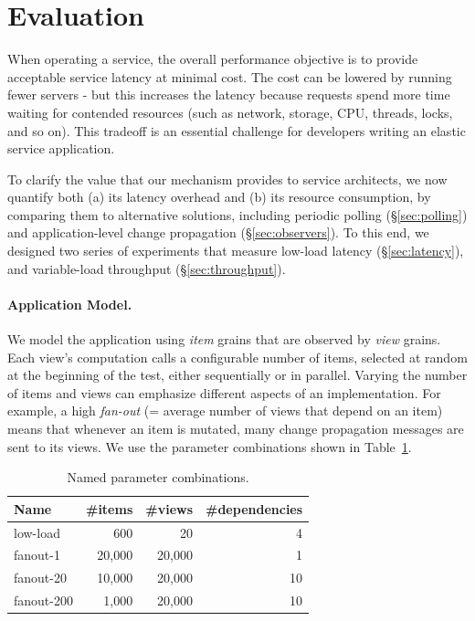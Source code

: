 \section{Evaluation}

When operating a service, the overall performance objective is to provide acceptable service latency at minimal cost. The cost can be lowered by running fewer servers - but this increases the latency because requests spend more time waiting for contended resources (such as network, storage, CPU, threads, locks, and so on). This tradeoff is an essential challenge for developers writing an elastic service application. 

To clarify the value that our mechanism provides to service architects, we now quantify both (a) its latency overhead and (b) its resource consumption, by comparing them to alternative solutions, including periodic polling (\S\ref{sec:polling}) and application-level change propagation (\S\ref{sec:observers}). To this end, we designed two series of experiments that measure low-load latency (\S\ref{sec:latency}), and variable-load throughput (\S\ref{sec:throughput}).

\paragraph{Application Model.}  
We model the application using  \emph{item} grains that are observed by \emph{view} grains. Each view's computation calls a configurable number of items, selected at random at the beginning of the test, either sequentially or in parallel. Varying the number of items and views can emphasize different aspects of an implementation. For example, a high \emph{fan-out} (= average number of views that depend on an item) means that whenever an item is mutated, many change propagation messages are sent to its views. We use the parameter combinations shown in Table~\ref{tab:param}.

\begin{table}
\begin{tabularx}{.99\columnwidth}{@{}Xrrr@{}} \toprule
Name		& \#items 	& \#views & \#dependencies \\ \midrule
low-load	&  600        	& 20       & 4  \\
fanout-1	& 20,000	& 20,000 & 1 \\
fanout-20	& 10,000	& 20,000 & 10 \\
fanout-200 & 1,000	& 20,000 & 10 \\  
\end{tabularx}
\caption{Named parameter combinations.}\label{tab:param}
\end{table}

